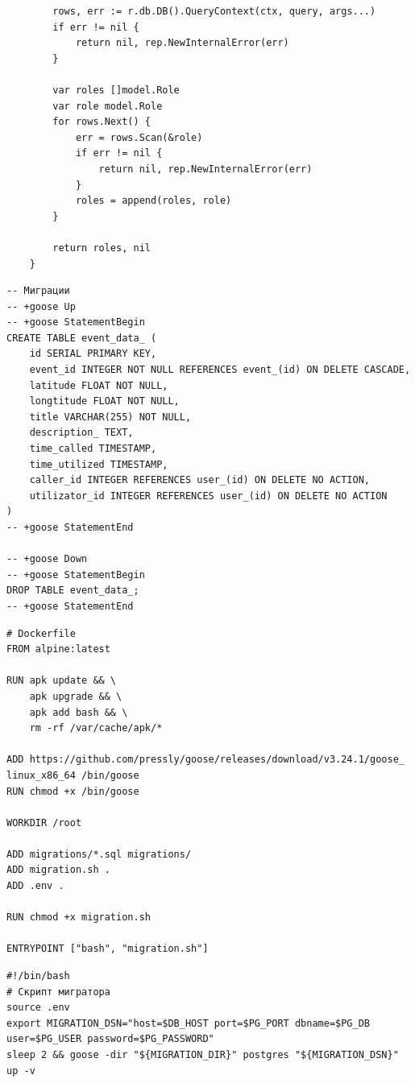 \documentclass[diploma]{SCWorks}
\begin{document}
\begin{verbatim}
        rows, err := r.db.DB().QueryContext(ctx, query, args...)
        if err != nil {
            return nil, rep.NewInternalError(err)
        }

        var roles []model.Role
        var role model.Role
        for rows.Next() {
            err = rows.Scan(&role)
            if err != nil {
                return nil, rep.NewInternalError(err)
            }
            roles = append(roles, role)
        }

        return roles, nil
    }
\end{verbatim}
   
\begin{verbatim}
-- Миграции
-- +goose Up
-- +goose StatementBegin
CREATE TABLE event_data_ (
    id SERIAL PRIMARY KEY,
    event_id INTEGER NOT NULL REFERENCES event_(id) ON DELETE CASCADE,
    latitude FLOAT NOT NULL,
    longtitude FLOAT NOT NULL,
    title VARCHAR(255) NOT NULL,
    description_ TEXT,
    time_called TIMESTAMP,
    time_utilized TIMESTAMP,
    caller_id INTEGER REFERENCES user_(id) ON DELETE NO ACTION,
    utilizator_id INTEGER REFERENCES user_(id) ON DELETE NO ACTION
)
-- +goose StatementEnd

-- +goose Down
-- +goose StatementBegin
DROP TABLE event_data_;
-- +goose StatementEnd
\end{verbatim}

\begin{verbatim}
# Dockerfile
FROM alpine:latest

RUN apk update && \
    apk upgrade && \
    apk add bash && \
    rm -rf /var/cache/apk/*

ADD https://github.com/pressly/goose/releases/download/v3.24.1/goose_
linux_x86_64 /bin/goose
RUN chmod +x /bin/goose

WORKDIR /root

ADD migrations/*.sql migrations/
ADD migration.sh .
ADD .env .

RUN chmod +x migration.sh

ENTRYPOINT ["bash", "migration.sh"]
\end{verbatim}
        
\begin{verbatim}
#!/bin/bash
# Скрипт мигратора
source .env
export MIGRATION_DSN="host=$DB_HOST port=$PG_PORT dbname=$PG_DB user=$PG_USER password=$PG_PASSWORD"
sleep 2 && goose -dir "${MIGRATION_DIR}" postgres "${MIGRATION_DSN}" up -v
\end{verbatim}
        
\end{document}
